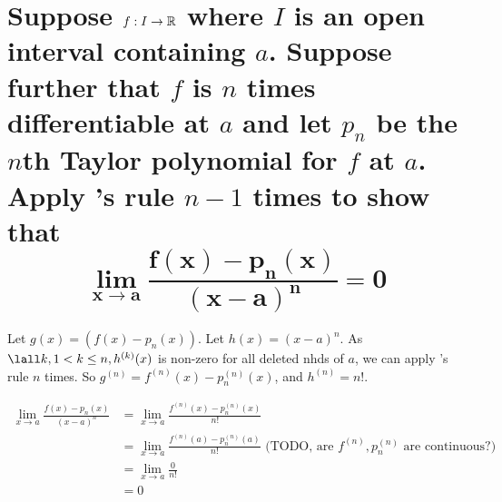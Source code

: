 \section{Suppose $f:I \to \mathbb{R}$ where $I$ is an open interval containing $a$.
    Suppose further that $f$ is $n$ times differentiable at $a$ 
    and let $p_n$ be the $n$th Taylor polynomial for $f$ at $a$.
    Apply \lhopital's rule $n-1$ times to show that
    \[
        \bm{\lim_{x\to a}\frac{f(x) - p_n(x)}{(x-a)^n} = 0}
    \]
}
    Let $g(x) = (f(x) - p_n(x))$.
    Let $h(x) = (x-a)^n$.
    As $\lall k, 1 < k \leq n, h^{(k)}(x)$ is non-zero for all deleted nhds of $a$,
    we can apply \lhopital's rule $n$ times.
    So $g^{(n)} = f^{(n)}(x) - p_n^{(n)}(x)$,
    and $h^{(n)} = n!$.

    \begin{align*}
        \lim_{x\to a}\frac{f(x) - p_n(x)}{(x-a)^n}
        &= \lim_{x\to a}\frac{f^{(n)}(x) - p_n^{(n)}(x)}{n!} \\
        &= \lim_{x\to a}\frac{f^{(n)}(a) - p_n^{(n)}(a)}{n!} 
            \text{ (TODO, are $f^{(n)}, p^{(n)}_n$ are continuous?)} \\
        &= \lim_{x\to a}\frac{0}{n!} \\
        &= 0
    \end{align*}


    





